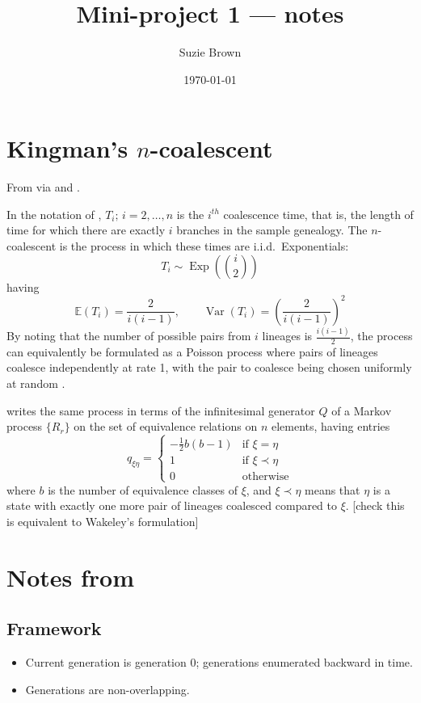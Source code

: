 \documentclass{article}
\title{Mini-project 1 --- notes}
\author{Suzie Brown}
\date{\today}
\newcommand{\E}{\mathbb{E}}
\newcommand{\V}{\operatorname{Var}}
\begin{document}
\section*{Kingman's $n$-coalescent}
From \citet{kingman1982gene} via \citet[Chapter 3]{wakeley2009} and \citet{mohle1998}.

In the notation of \citet{wakeley2009}, $T_i;\, i=2,\dots,n$ is the $i^{th}$ coalescence time, that is, the length of time for which there are exactly $i$ branches in the sample genealogy. The $n$-coalescent is the process in which these times are i.i.d.\ Exponentials:
\begin{equation*}
T_i \sim \operatorname{Exp}\left(\binom{i}{2}\right)
\end{equation*}
having
\begin{equation*}
\E(T_i) = \frac{2}{i(i-1)}, \qquad \V(T_i) = \left( \frac{2}{i(i-1)} \right)^2
\end{equation*}
By noting that the number of possible pairs from $i$ lineages is $\frac{i(i-1)}{2}$, the process can equivalently be formulated as a Poisson process where pairs of lineages coalesce independently at rate 1, with the pair to coalesce being chosen uniformly at random \citep[Section 3.2]{wakeley2009}.

\citet{mohle1998} writes the same process in terms of the infinitesimal generator $Q$ of a Markov process $\{R_r\}$ on the set of equivalence relations on $n$ elements, having entries
\begin{equation*}
q_{\xi\eta} =
\begin{cases}
-\frac{1}{2}b(b-1) &\text{if }\xi=\eta \\
1 & \text{if }\xi \prec\eta \\
0 & \text{otherwise}
\end{cases}
\end{equation*}
where $b$ is the number of equivalence classes of $\xi$, and $\xi \prec \eta$ means that $\eta$ is a state with exactly one more pair of lineages coalesced compared to $\xi$. [check this is equivalent to Wakeley's formulation]


\section*{Notes from \citet{mohle1998}}

\subsection*{Framework}
\begin{itemize}
\item Current generation is generation $0$; generations enumerated backward in time.
\item Generations are non-overlapping.
\end{itemize}
\end{document}
